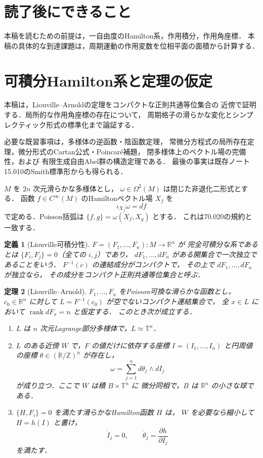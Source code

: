 \documentclass[a5paper,10pt,onecolumn]{jsarticle}
\theoremstyle{mathnotetheorem}
\newtheorem{theorem}{定理}[section]
\newtheorem{definition}[theorem]{定義}
\begin{document}
\section*{読了後にできること}
本稿を読むための前提は，一自由度のHamilton系，作用積分，作用角座標．
本稿の具体的な到達課題は，周期運動の作用変数を位相平面の面積から計算する．

\section{可積分Hamilton系と定理の仮定}
本稿は，Liouville--Arnoldの定理をコンパクトな正則共通等位集合の
近傍で証明する．局所的な作用角座標の存在について，
周期格子の滑らかな変化とシンプレクティック形式の標準化まで論証する．

必要な既習事項は，多様体の逆函数・陰函数定理，
常微分方程式の局所存在定理，微分形式のCartan公式・Poincar\'e補題，
閉多様体上のベクトル場の完備性，および
有限生成自由Abel群の構造定理である．
最後の事実は既存ノート15.010のSmith標準形からも得られる．

$M$ を $2n$ 次元滑らかな多様体とし，
$\omega\in\Omega^2(M)$ は閉じた非退化二形式とする．
函数 $f\in C^\infty(M)$ のHamiltonベクトル場 $X_f$ を
\[
 \iota_{X_f}\omega=df
\]
で定める．Poisson括弧は
$\{f,g\}=\omega(X_f,X_g)$ とする．
これは70.020の規約と一致する．

\begin{definition}[Liouville可積分性]
$F=(F_1,\ldots,F_n):M\to\mathbb R^n$ が
\emph{完全可積分な系}であるとは
$\{F_i,F_j\}=0$（全ての $i,j$）であり，
$dF_1,\ldots,dF_n$ がある開集合で一次独立であることをいう．
$F^{-1}(c)$ の連結成分がコンパクトで，
その上で $dF_1,\ldots,dF_n$ が独立なら，
その成分をコンパクト正則共通等位集合と呼ぶ．
\end{definition}

\begin{theorem}[Liouville--Arnold]
$F_1,\ldots,F_n$ をPoisson可換な滑らかな函数とし，
$c_0\in\mathbb R^n$ に対して
$L=F^{-1}(c_0)$ が空でないコンパクト連結集合で，
全 $x\in L$ において $\operatorname{rank}dF_x=n$ と仮定する．
このとき次が成立する．
\begin{enumerate}
 \item $L$ は $n$ 次元Lagrange部分多様体で，$L\simeq\mathbb T^n$．
 \item $L$ のある近傍 $W$ で，$F$ の値だけに依存する座標
       $I=(I_1,\ldots,I_n)$ と円周値の座標
       $\theta\in(\mathbb R/\mathbb Z)^n$ が存在し，
       \[
       \omega=\sum_{j=1}^n d\theta_j\wedge dI_j
       \]
       が成り立つ．ここで $W$ は積 $B\times\mathbb T^n$ に
       微分同相で，$B$ は $\mathbb R^n$ の小さな球である．
 \item $\{H,F_i\}=0$ を満たす滑らかなHamilton函数 $H$ は，
       $W$ を必要なら縮小して $H=h(I)$ と書け，
       \[
          \dot I_j=0,\qquad
          \dot\theta_j=\frac{\partial h}{\partial I_j}
       \]
       を満たす．
\end{enumerate}
\end{theorem}
\end{document}

